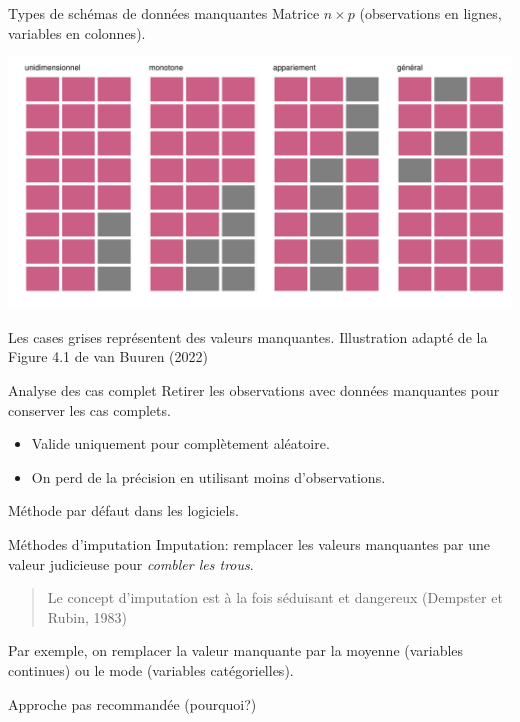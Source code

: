\documentclass[
  ignorenonframetext,
]{beamer}
\providecommand{\tightlist}{%
  \setlength{\itemsep}{0pt}\setlength{\parskip}{0pt}}\usepackage{longtable,booktabs,array}
\begin{document}
\begin{frame}{Types de schémas de données manquantes}
\protect\hypertarget{types-de-schuxe9mas-de-donnuxe9es-manquantes}{}
Matrice \(n \times p\) (observations en lignes, variables en colonnes).

\includegraphics[width=1\textwidth,height=\textheight]{MATH60602-diapos13_files/figure-beamer/unnamed-chunk-1-1.pdf}

\footnotesize

Les cases grises représentent des valeurs manquantes. Illustration
adapté de la Figure 4.1 de van Buuren (2022)
\end{frame}

\begin{frame}{Analyse des cas complet}
\protect\hypertarget{analyse-des-cas-complet}{}
Retirer les observations avec données manquantes pour conserver les cas
complets.

\begin{itemize}
\tightlist
\item
  Valide uniquement pour complètement aléatoire.
\item
  On perd de la précision en utilisant moins d'observations.
\end{itemize}

Méthode par défaut dans les logiciels.
\end{frame}

\begin{frame}{Méthodes d'imputation}
\protect\hypertarget{muxe9thodes-dimputation}{}
Imputation: remplacer les valeurs manquantes par une valeur judicieuse
pour \emph{combler les trous}.

\begin{quote}
Le concept d'imputation est à la fois séduisant et dangereux (Dempster
et Rubin, 1983)
\end{quote}

Par exemple, on remplacer la valeur manquante par la moyenne (variables
continues) ou le mode (variables catégorielles).

Approche pas recommandée (pourquoi?)
\end{frame}
\end{document}
